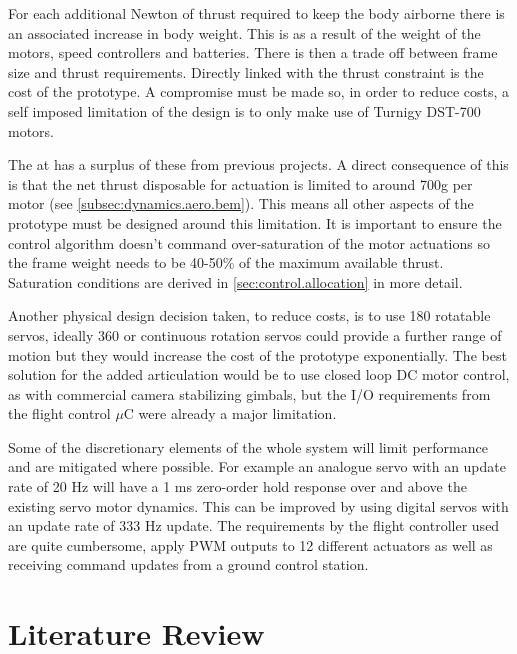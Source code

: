 For each additional Newton of thrust required to keep the body airborne there is an associated increase in body weight. This is as a result of the weight of the motors, speed controllers and batteries. There is then a trade off between frame size and thrust requirements. Directly linked with the thrust constraint is the cost of the prototype. A compromise must be made so, in order to reduce costs, a self imposed limitation of the design is to only make use of Turnigy DST-700 motors.
\par
The \dept at \uni has a surplus of these from previous projects. A direct consequence of this is that the net thrust disposable for actuation is limited to around 700g per motor (see \ref{subsec:dynamics.aero.bem}). This means all other aspects of the prototype must be designed around this limitation. It is important to ensure the control algorithm doesn't command over-saturation of the motor actuations so the frame weight needs to be 40-50\% of the maximum available thrust. Saturation conditions are derived in \ref{sec:control.allocation} in more detail.
\par
Another physical design decision taken, to reduce costs, is to use 180 \textdegree rotatable servos, ideally 360 \textdegree or continuous rotation servos could provide a further range of motion but they would increase the cost of the prototype exponentially. The best solution for the added articulation would be to use closed loop DC motor control, as with commercial camera stabilizing gimbals, but the I/O requirements from the flight control $\mu$C were already a major limitation.
\par
Some of the discretionary elements of the whole system will limit performance and are mitigated where possible. For example an analogue servo with an update rate of 20 Hz will have a 1 ms zero-order hold response over and above the existing servo motor dynamics. This can be improved by using digital servos with an update rate of 333 Hz update. The requirements by the flight controller used are quite cumbersome, apply PWM outputs to 12 different actuators as well as receiving command updates from a ground control station. 
\section{Literature Review}
\label{sec:intro.litreview}
